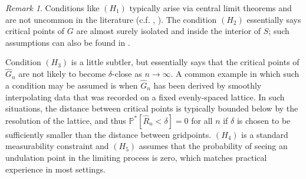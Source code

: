 \documentclass[11pt]{article}
\newcommand{\1}{\mathbf{1}}
\theoremstyle{definition}
\theoremstyle{remark}
\newtheorem*{remark}{Remark}
\begin{document}
\begin{remark}
    Conditions like $(H_1)$ typically arise via central limit theorems and are not uncommon in the literature (c.f. \cite{adler1981geometry}, \cite{chung2020introductionrandomfields}). The condition $(H_2)$ essentially says critical points of $G$ are almost surely isolated and inside the interior of $S$; such assumptions can also be found in \cite{davenport2022confidenceregionslocationpeaks}. 
    
    Condition $(H_3)$ is a little subtler, but essentially says that the critical points of $\hat{G}_n$ are not likely to become $\delta$-close as $n\rightarrow \infty$. A common example in which such a condition may be assumed is when $\hat{G}_n$ has been derived by smoothly interpolating data that was recorded on a fixed evenly-spaced lattice. In such situations, the distance between critical points is typically bounded below by the resolution of the lattice, and thus $\mathbb{P}^{*}[\hat{R}_n < \delta] =0$ for all $n$ if $\delta$ is chosen to be sufficiently smaller than the distance between gridpoints. $(H_4)$ is a standard measurability constraint and $(H_5)$ assumes that the probability of seeing an undulation point in the limiting process is zero, which matches practical experience in most settings.
\end{remark}
\end{document}
